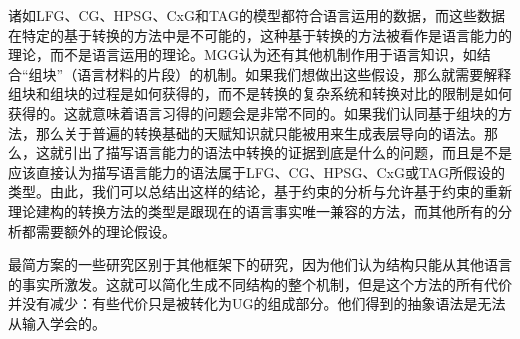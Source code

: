 诸如LFG、CG、HPSG、CxG和TAG的模型都符合语言运用的数据，而这些数据在特定的基于转换的方法中是不可能的，这种基于转换的方法被看作是语言能力的理论，而不是语言运用的理论。MGG认为还有其他机制作用于语言知识，如结合“组块”（语言材料的片段）的机制。如果我们想做出这些假设，那么就需要解释组块和组块的过程是如何获得的，而不是转换的复杂系统和转换对比的限制是如何获得的。这就意味着语言习得的问题会是非常不同的。如果我们认同基于组块的方法，那么关于普遍的转换基础的天赋知识就只能被用来生成表层导向的语法。那么，这就引出了描写语言能力的语法中转换的证据到底是什么的问题，而且是不是应该直接认为描写语言能力的语法属于LFG、CG、HPSG、CxG或TAG所假设的类型。由此，我们可以总结出这样的结论，基于约束的分析与允许基于约束的重新理论建构的转换方法的类型是跟现在的语言事实唯一兼容的方法，而其他所有的分析都需要额外的理论假设。

最简方案的一些研究区别于其他框架下的研究，因为他们认为结构只能从其他语言的事实所激发。这就可以简化生成不同结构的整个机制，但是这个方法的所有代价并没有减少：有些代价只是被转化为UG的组成部分。他们得到的抽象语法是无法从输入学会的。

